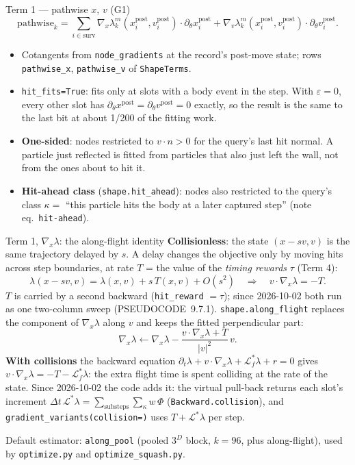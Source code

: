 \documentclass[10pt,aspectratio=169]{beamer}
\newcommand{\code}[1]{\texttt{\small #1}}
\newcommand{\pth}{\mathrm{post}}
\begin{document}
\begin{frame}{Term 1 --- pathwise $x$, $v$ (G1)}
\[
\text{pathwise}_k = \sum_{i\in\text{surv}}
\nabla_x\lambda^m_k(x^\pth_i, v^\pth_i)\cdot\partial_\theta x^\pth_i
+ \nabla_v\lambda^m_k(x^\pth_i, v^\pth_i)\cdot\partial_\theta v^\pth_i .
\]
\begin{itemize}
\item Cotangents from \code{node\_gradients} at the record's post-move state; rows
  \code{pathwise\_x}, \code{pathwise\_v} of \code{ShapeTerms}.
\item \code{hit\_fits=True}: fits only at slots with a body event in the step.  With
  $\varepsilon = 0$, every other slot has $\partial_\theta x^\pth = \partial_\theta v^\pth = 0$
  exactly, so the result is the same to the last bit at about 1/200 of the fitting work.
\item \textbf{One-sided}: nodes restricted to $v\cdot n > 0$ for the query's last hit
  normal.  A particle just reflected is fitted from particles that also just left the wall,
  not from the ones about to hit it.
\item \textbf{Hit-ahead class} (\code{shape.hit\_ahead}): nodes also restricted to
  the query's class $\kappa = $ ``this particle hits the body at a later captured step''
  (note eq.\ \code{hit-ahead}).
\end{itemize}
\end{frame}

\begin{frame}{Term 1, $\nabla_x\lambda$: the along-flight identity}
\textbf{Collisionless}: the state $(x - s v, v)$ is the same trajectory delayed by $s$.  A delay
changes the objective only by moving hits across step boundaries, at rate $T$ = the value of
the \emph{timing rewards} $\tau$ (Term 4):
\[
\lambda(x - s v, v) = \lambda(x,v) + s\,T(x,v) + O(s^2)
\quad\Longrightarrow\quad
v\cdot\nabla_x\lambda = -T .
\]
$T$ is carried by a second backward (\code{hit\_reward} $= \tau$); since 2026-10-02 both run
as one two-column sweep (PSEUDOCODE~9.7.1).  \code{shape.along\_flight} replaces the
component of $\nabla_x\lambda$ along $v$ and keeps the fitted perpendicular part:
\[
\nabla_x\lambda \leftarrow \nabla_x\lambda - \frac{v\cdot\nabla_x\lambda + T}{|v|^2}\,v .
\]
\textbf{With collisions} the backward equation $\partial_t\lambda + v\cdot\nabla_x\lambda +
\mathcal L^*_f\lambda + r = 0$ gives $v\cdot\nabla_x\lambda = -T - \mathcal L^*_f\lambda$: the
extra flight time is spent colliding at the rate of the state.  Since 2026-10-02 the code adds
it: the virtual pull-back returns each slot's increment $\Delta t\,\mathcal L^*\lambda =
\sum_{\text{substeps}}\sum_\kappa w\,\Phi$ (\code{Backward.collision}), and
\code{gradient\_variants(collision=)} uses $T + \mathcal L^*\lambda$ per step.

\medskip
Default estimator: \code{along\_pool} (pooled $3^D$ block, $k = 96$, plus along-flight),
used by \code{optimize.py} and \code{optimize\_squash.py}.
\end{frame}
\end{document}
